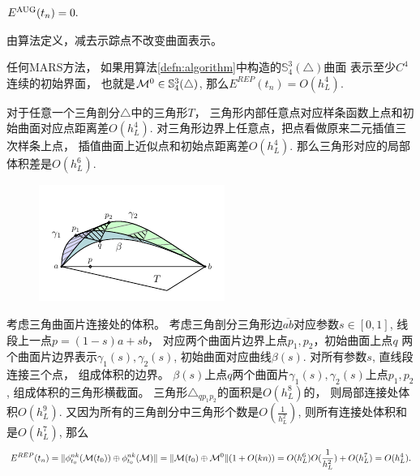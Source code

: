 \begin{prop}
  $E^{\textmd{AUG}}(t_n)=0.$
\end{prop}
\begin{pro}
  由算法定义，减去示踪点不改变曲面表示。
\end{pro}


\begin{prop}\label{prop:errorREP}
  任何MARS方法，
  如果用算法\ref{defn:algorithm}中构造的$\mathbb{S}^3_4(\triangle)$曲面
  表示至少$C^4$连续的初始界面，
  也就是${\cal M}^0\in \mathbb{S}^3_4(\triangle)$,
  那么$ E^{REP}(t_n)=O(h_L^4)$.
\end{prop}

\begin{pro}
  对于任意一个三角剖分$\triangle$中的三角形$T$，
  三角形内部任意点对应样条函数上点和初始曲面对应点距离差$O(h_L^4)$.
  对三角形边界上任意点，把点看做原来二元插值三次样条上点，
  插值曲面上近似点和初始点距离差$O(h_L^4).$
  那么三角形对应的局部体积差是$O(h_L^6).$
  
  \begin{figure}[H]
    \centering
    \includegraphics[width=0.35\linewidth]{tikz/volume}
    \label{fig:volume}
  \end{figure}  
  考虑三角曲面片连接处的体积。
  考虑三角剖分三角形边$\overline{ab}$对应参数$s\in[0,1]$,
  线段上一点$p=(1-s)a+sb$，
  对应两个曲面片边界上点$p_1,p_2$，初始曲面上点$q$
  两个曲面片边界表示$\gamma_1(s),\gamma_2(s)$,
  初始曲面对应曲线$\beta(s)$.
  对所有参数$s$,
  直线段连接三个点，
  组成体积的边界。
  $\beta(s)$上点$q$两个曲面片$\gamma_1(s),\gamma_2(s)$上点$p_1,p_2$,
  组成体积的三角形横截面。
  三角形$\triangle_{qp_1p_2}$的面积是$O(h_L^8)$的，
  则局部连接处体积$O(h_L^9)$.
  又因为所有的三角剖分中三角形个数是$O(\frac{1}{h_L^2})$,
  则所有连接处体积和是$O(h_L^7)$,
  那么
  \begin{displaymath}
    E^{REP}(t_n)=\lVert \phi^{nk}_{t_0}({\cal M}(t_0))\oplus
  \phi^{nk}_{t_0}({\cal M})\rVert
  =\lVert {\cal M}(t_0)\oplus{\cal M}^0\rVert(1+O(kn))
  =O(h_L^6)O(\frac{1}{h_L^2})+O(h_L^7)=O(h_L^4).
  \end{displaymath}
\end{pro}

